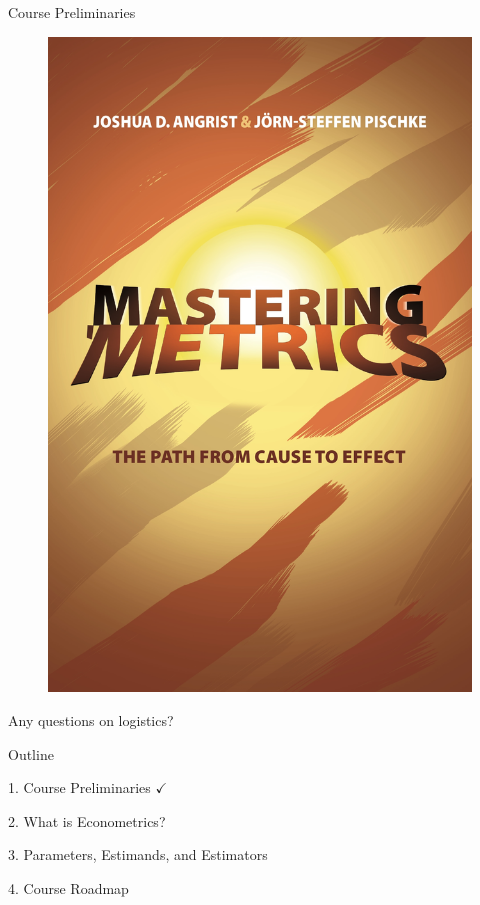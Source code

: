 \documentclass[11pt,english,handout]{beamer}
\begin{document}
\begin{frame}{Course Preliminaries}
\begin{figure}
\begin{minipage}{0.45\textwidth}
			\includegraphics[width=\textwidth]{book_masteringmetrics.jpg}
		\end{minipage}
	\end{figure}


	\vspace{0.5cm}
	Any questions on logistics? 

\end{frame}

\begin{frame}{Outline}

	1. Course Preliminaries $\checkmark$
	\vspace{0.8cm}

	2. What is Econometrics?
	\vspace{0.8cm}

	3. Parameters, Estimands, and Estimators
	\vspace{0.8cm}

	4. Course Roadmap

\end{frame}
\end{document}
